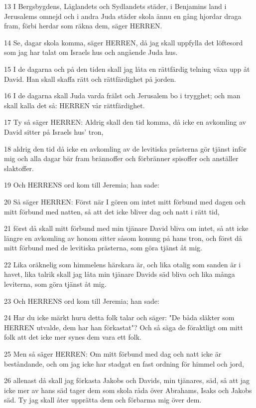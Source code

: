 \par 13 I Bergsbygdens, Låglandets och Sydlandets städer, i Benjamins land i Jerusalems omnejd och i andra Juda städer skola ännu en gång hjordar draga fram, förbi herdar som räkna dem, säger HERREN.
\par 14 Se, dagar skola komma, säger HERREN, då jag skall uppfylla det löftesord som jag har talat om Israels hus och angående Juda hus.
\par 15 I de dagarna och på den tiden skall jag låta en rättfärdig telning växa upp åt David. Han skall skaffa rätt och rättfärdighet på jorden.
\par 16 I de dagarna skall Juda varda frälst och Jerusalem bo i trygghet; och man skall kalla det så: HERREN vår rättfärdighet.
\par 17 Ty så säger HERREN: Aldrig skall den tid komma, då icke en avkomling av David sitter på Israels hus' tron,
\par 18 aldrig den tid då icke en avkomling av de levitiska prästerna gör tjänst inför mig och alla dagar bär fram brännoffer och förbränner spisoffer och anställer slaktoffer.
\par 19 Och HERRENS ord kom till Jeremia; han sade:
\par 20 Så säger HERREN: Först när I gören om intet mitt förbund med dagen och mitt förbund med natten, så att det icke bliver dag och natt i rätt tid,
\par 21 först då skall mitt förbund med min tjänare David bliva om intet, så att icke längre en avkomling av honom sitter såsom konung på hans tron, och först då mitt förbund med de levitiska prästerna, som göra tjänst åt mig.
\par 22 Lika oräknelig som himmelens härskara är, och lika otalig som sanden är i havet, lika talrik skall jag låta min tjänare Davids säd bliva och lika många leviterna, som göra tjänst åt mig.
\par 23 Och HERRENS ord kom till Jeremia; han sade:
\par 24 Har du icke märkt huru detta folk talar och säger: "De båda släkter som HERREN utvalde, dem har han förkastat"? Och så säga de föraktligt om mitt folk att det icke mer synes dem vara ett folk.
\par 25 Men så säger HERREN: Om mitt förbund med dag och natt icke är beståndande, och om jag icke har stadgat en fast ordning för himmel och jord,
\par 26 allenast då skall jag förkasta Jakobs och Davids, min tjänares, säd, så att jag icke mer av hans säd tager dem som skola råda över Abrahams, Isaks och Jakobs säd. Ty jag skall åter upprätta dem och förbarma mig över dem.

